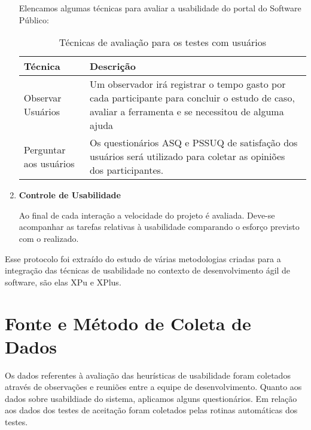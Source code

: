 \begin{enumerate}
	Elencamos algumas técnicas para avaliar a usabilidade do portal do Software Público:

	\begin{table}[h]
	\begin{tabular}{|l| p{10cm}	|}
		\hline
		Técnica & Descrição \\ \hline
		Observar Usuários & Um observador irá registrar o tempo 
		gasto por cada participante para concluir o estudo de caso, 
		avaliar a ferramenta e se necessitou de alguma ajuda    \\ \hline
		Perguntar aos usuários & Os questionários ASQ e PSSUQ 
		de satisfação dos usuários será utilizado 
		para coletar as opiniões dos participantes.\\ \hline
	\end{tabular}
	\caption{Técnicas de avaliação para os testes com usuários}
	\end{table}
	
	\item \textbf{Controle de Usabilidade}
	
	Ao final de cada interação a velocidade do projeto é avaliada. Deve-se acompanhar as tarefas relativas à usabilidade comparando o esforço previsto com o realizado.
	
\end{enumerate}

Esse protocolo foi extraído do estudo de várias metodologias criadas para a integração das técnicas de usabilidade no contexto de desenvolvimento ágil de software, são elas XPu e XPlus.
 
 


	

\section{Fonte e Método de Coleta de Dados}

Os dados referentes à avaliação das heurísticas de usabilidade foram coletados através de observações e reuniões entre a equipe de desenvolvimento. Quanto aos dados sobre usabildiade do sistema, aplicamos alguns questionários. Em relação aos dados dos testes de aceitação foram coletados pelas rotinas automáticas dos testes.

